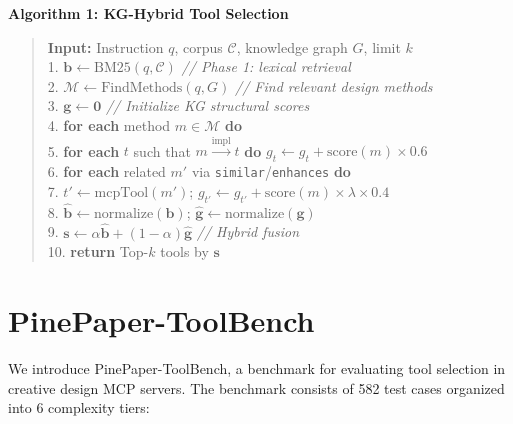 \documentclass[11pt,a4paper]{article}
\begin{document}
\noindent\textbf{Algorithm 1: KG-Hybrid Tool Selection}
\label{alg:kg-hybrid}
\begin{quote}
\small
\textbf{Input:} Instruction $q$, corpus $\mathcal{C}$, knowledge graph $G$, limit $k$ \\[3pt]
1. $\mathbf{b} \leftarrow \text{BM25}(q, \mathcal{C})$ \hfill \textit{// Phase 1: lexical retrieval} \\
2. $\mathcal{M} \leftarrow \text{FindMethods}(q, G)$ \hfill \textit{// Find relevant design methods} \\
3. $\mathbf{g} \leftarrow \mathbf{0}$ \hfill \textit{// Initialize KG structural scores} \\
4. \textbf{for each} method $m \in \mathcal{M}$ \textbf{do} \\
5. \quad \textbf{for each} $t$ such that $m \xrightarrow{\text{impl}} t$ \textbf{do} $g_t \leftarrow g_t + \text{score}(m) \times 0.6$ \\
6. \quad \textbf{for each} related $m'$ via \texttt{similar}/\texttt{enhances} \textbf{do} \\
7. \quad\quad $t' \leftarrow \text{mcpTool}(m')$;\; $g_{t'} \leftarrow g_{t'} + \text{score}(m) \times \lambda \times 0.4$ \\
8. $\hat{\mathbf{b}} \leftarrow \text{normalize}(\mathbf{b})$;\; $\hat{\mathbf{g}} \leftarrow \text{normalize}(\mathbf{g})$ \\
9. $\mathbf{s} \leftarrow \alpha \hat{\mathbf{b}} + (1 - \alpha) \hat{\mathbf{g}}$ \hfill \textit{// Hybrid fusion} \\
10. \textbf{return} Top-$k$ tools by $\mathbf{s}$
\end{quote}

\section{PinePaper-ToolBench}
\label{sec:dataset}

We introduce PinePaper-ToolBench, a benchmark for evaluating tool selection in creative design MCP servers. The benchmark consists of 582 test cases organized into 6 complexity tiers:
\end{document}
